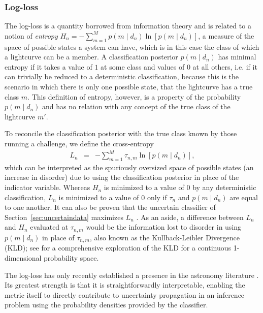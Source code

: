 \subsubsection{Log-loss}
\label{sec:logloss}

The log-loss is a quantity borrowed from information theory and is related to a notion of \textit{entropy} $H_{n} = - \sum_{m=1}^{M} p(m \mid d_{n}) \ln[p(m \mid d_{n})]$, a measure of the space of possible states a system can have, which is in this case the class of which a lightcurve can be a member.
A classification posterior $p(m \mid d_{n})$ has minimal entropy if it takes a value of $1$ at some class and values of $0$ at all others, i.e. if it can trivially be reduced to a deterministic classification, because this is the scenario in which there is only one possible state, that the lightcurve has a true class $m$.
This definition of entropy, however, is a property of the probability $p(m \mid d_{n})$ and has no relation with any concept of the true class of the lightcurve $m'$.

To reconcile the classification posterior with the true class known by those running a challenge, we define the cross-entropy
\begin{eqnarray}
  \label{eq:logloss}
  L_{n} &=& -\sum_{m=1}^{M} \tau_{n, m} \ln[p(m \mid d_{n})],
\end{eqnarray}
which can be interpreted as the spuriously oversized space of possible states (an increase in disorder) due to using the classification posterior in place of the indicator variable.
Whereas $H_{n}$ is minimized to a value of $0$ by any deterministic classification, $L_{n}$ is minimized to a value of $0$ only if $\tau_{n}$ and $p(m \mid d_{n})$ are equal to one another.
It can also be proven that the uncertain classifier of Section~\ref{sec:uncertaindata} maximizes $L_{n}$ \citep{murphy_machine_2012}.
As an aside, a difference between $L_{n}$ and $H_{n}$ evaluated at $\tau_{n, m}$ would be the information lost to disorder in using $p(m \mid d_{n})$ in place of $\tau_{n, m}$, also known as the Kullback-Leibler Divergence (KLD); see \citet{malz_approximating_2018} for a comprehensive exploration of the KLD for a continuous 1-dimensional probability space.

The log-loss has only recently established a presence in the astronomy literature \citep{hon_deep_2017, hon_deep_2018}.
Its greatest strength is that it is straightforwardly interpretable, enabling the metric itself to directly contribute to uncertainty propagation in an inference problem using the probability densities provided by the classifier.

